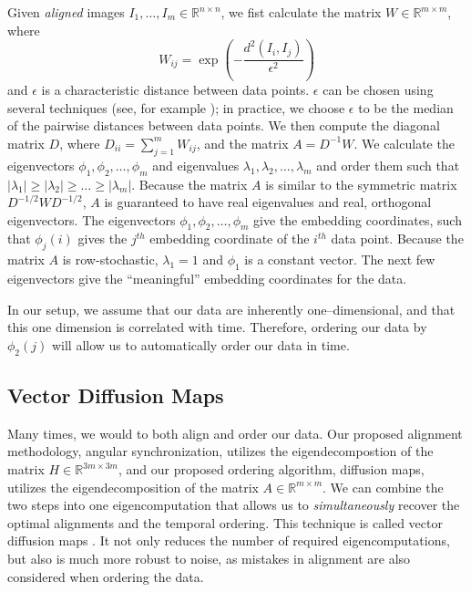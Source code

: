 \documentclass[twocolumn, 11pt]{article}
\begin{document}
Given {\em aligned} images $I_1, \dots, I_m \in \mathbb{R}^{n \times n}$, we fist calculate the matrix $W \in \mathbb{R}^{m \times m}$, where 
\begin{equation} \label{eq:dmaps_W}
W_{ij} = \exp \left( -\frac{d^2(I_i, I_j)}{\epsilon^2} \right)
\end{equation}
and $\epsilon$ is a characteristic distance between data points.
%
$\epsilon$ can be chosen using several techniques (see, for example \cite{coifman2008graph}); in practice, we choose $\epsilon$ to be the median of the pairwise distances between data points.
%
We then compute the diagonal matrix $D$, where $D_{ii} = \sum_{j=1}^{m} W_{ij}$, and the matrix $A = D^{-1} W$. 
%
We calculate the eigenvectors $\phi_1, \phi_2, \dots, \phi_m$ and eigenvalues $\lambda_1, \lambda_2, \dots, \lambda_m$ and order them such that $|\lambda_1| \ge |\lambda_2| \ge \dots \ge |\lambda_m|$. 
%
Because the matrix $A$ is similar to the symmetric matrix $D^{-1/2} W D^{-1/2}$, $A$ is guaranteed to have real eigenvalues and real, orthogonal eigenvectors. 
%
The eigenvectors $\phi_1, \phi_2, \dots, \phi_m$ give the embedding coordinates, such that $\phi_j(i)$ gives the $j^{th}$ embedding coordinate of the $i^{th}$ data point. 
%
Because the matrix $A$ is row-stochastic, $\lambda_1=1$ and $\phi_1$ is a constant vector.
%
The next few eigenvectors give the ``meaningful'' embedding coordinates for the data. 

In our setup, we assume that our data are inherently one--dimensional, and that this one dimension is correlated with time.
%
Therefore, ordering our data by $\phi_2(j)$ will allow us to automatically order our data in time. 

\subsection{Vector Diffusion Maps}

Many times, we would to both align and order our data.
%
Our proposed alignment methodology, angular synchronization, utilizes the eigendecompostion of the matrix $H \in \mathbb{R}^{3m \times 3m}$, and our proposed ordering algorithm, diffusion maps, utilizes the eigendecomposition of the matrix $A \in \mathbb{R}^{m \times m}$.
%
We can combine the two steps into one eigencomputation that allows us to {\em simultaneously} recover the optimal alignments and the temporal ordering.
%
This technique is called vector diffusion maps \cite{singer2012vector}.
%
It not only reduces the number of required eigencomputations, but also is much more robust to noise, as mistakes in alignment are also considered when ordering the data.
\end{document}

